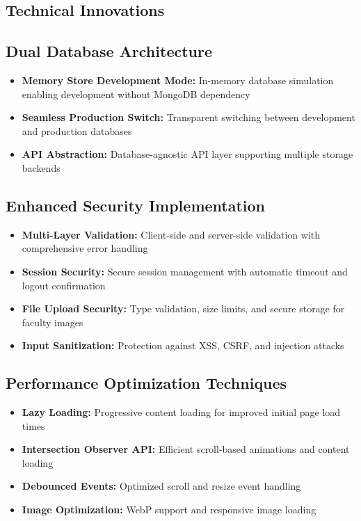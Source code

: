 \documentclass[12pt,a4paper]{report}
\begin{document}
\subsection{Technical Innovations}

\subsection{Dual Database Architecture}
\begin{itemize}
    \item \textbf{Memory Store Development Mode:} In-memory database simulation enabling development without MongoDB dependency
    \item \textbf{Seamless Production Switch:} Transparent switching between development and production databases
    \item \textbf{API Abstraction:} Database-agnostic API layer supporting multiple storage backends
\end{itemize}

\subsection{Enhanced Security Implementation}
\begin{itemize}
    \item \textbf{Multi-Layer Validation:} Client-side and server-side validation with comprehensive error handling
    \item \textbf{Session Security:} Secure session management with automatic timeout and logout confirmation
    \item \textbf{File Upload Security:} Type validation, size limits, and secure storage for faculty images
    \item \textbf{Input Sanitization:} Protection against XSS, CSRF, and injection attacks
\end{itemize}

\subsection{Performance Optimization Techniques}
\begin{itemize}
    \item \textbf{Lazy Loading:} Progressive content loading for improved initial page load times
    \item \textbf{Intersection Observer API:} Efficient scroll-based animations and content loading
    \item \textbf{Debounced Events:} Optimized scroll and resize event handling
    \item \textbf{Image Optimization:} WebP support and responsive image loading
\end{itemize}
\end{document}
